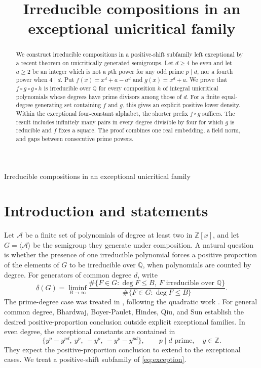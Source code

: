 \documentclass[11pt]{article}
\title{Irreducible compositions in an exceptional unicritical family}
\author{}
\date{}
\theoremstyle{remark}
\newcommand{\Q}{\mathbb{Q}}
\newcommand{\Z}{\mathbb{Z}}
\begin{document}
\begin{center}
{\Large Irreducible compositions in an exceptional unicritical family}
\end{center}
\vspace{0.6em}
\begin{abstract}
We construct irreducible compositions in a positive-shift subfamily left exceptional by a recent theorem on unicritically generated semigroups. Let $d\geq4$ be even and let $a\geq2$ be an integer which is not a $p$th power for any odd prime $p\mid d$, nor a fourth power when $4\mid d$. Put $f(x)=x^d+a-a^d$ and $g(x)=x^d+a$. We prove that $f\circ g\circ g\circ h$ is irreducible over $\Q$ for every composition $h$ of integral unicritical polynomials whose degrees have prime divisors among those of $d$. For a finite equal-degree generating set containing $f$ and $g$, this gives an explicit positive lower density. Within the exceptional four-constant alphabet, the shorter prefix $f\circ g$ suffices. The result includes infinitely many pairs in every degree divisible by four for which $g$ is reducible and $f$ fixes a square. The proof combines one real embedding, a field norm, and gaps between consecutive prime powers.
\end{abstract}

\section{Introduction and statements}
Let $\mathcal A$ be a finite set of polynomials of degree at least two in $\Z[x]$, and let $G=\langle\mathcal A\rangle$ be the semigroup they generate under composition. A natural question is whether the presence of one irreducible polynomial forces a positive proportion of the elements of $G$ to be irreducible over $\Q$, when polynomials are counted by degree. For generators of common degree $d$, write
\[
 \underline\delta(G)=\liminf_{B\to\infty}
 \frac{\#\{F\in G:\deg F\leq B,\ F\text{ irreducible over }\Q\}}
 {\#\{F\in G:\deg F\leq B\}}.
\]
The prime-degree case was treated in \cite{HJK}, following the quadratic work \cite{HJY}. For general common degree, Bhardwaj, Boyer-Paulet, Hindes, Qiu, and Sun \cite[Theorem~1.1]{BBHQS} establish the desired positive-proportion conclusion outside explicit exceptional families. In even degree, the exceptional constants are contained in
\begin{equation}\label{eq:exception}
 \{y^p-y^{pd},\ y^p,\ -y^p,\ -y^p-y^{pd}\},
 \qquad p\mid d\text{ prime},\quad y\in\Z.
\end{equation}
They expect the positive-proportion conclusion to extend to the exceptional cases. We treat a positive-shift subfamily of \eqref{eq:exception}.
\end{document}
